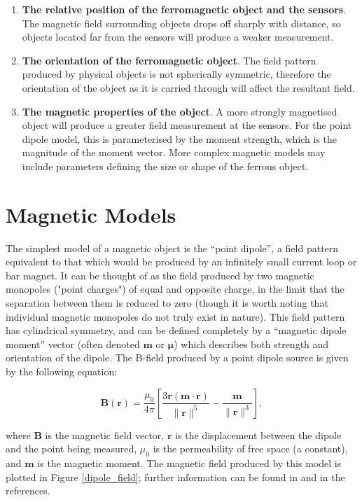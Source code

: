 \documentclass[10pt, a4paper, twocolumn]{article} %
\begin{document}
\begin{enumerate}
	\item \textbf{The relative position of the ferromagnetic object and the sensors}. The magnetic field surrounding objects drops off sharply with distance, so objects located far from the sensors will produce a weaker measurement.
	
	\item \textbf{The orientation of the ferromagnetic object}. The field pattern produced by physical objects is not spherically symmetric, therefore the orientation of the object as it is carried through will affect the resultant field.
	
	\item \textbf{The magnetic properties of the object}. A more strongly magnetised object will produce a greater field measurement at the sensors. For the point dipole model, this is parameterised by the moment strength, which is the magnitude of the moment vector. More complex magnetic models may include parameters defining the size or shape of the ferrous object.
\end{enumerate}

\section{Magnetic Models}
\label{Mag_models}

The simplest model of a magnetic object is the “point dipole”, a field pattern equivalent to that which would be produced by an infinitely small current loop or bar magnet. It can be thought of as the field produced by two magnetic monopoles ("point charges") of equal and opposite charge, in the limit that the separation between them is reduced to zero (though it is worth noting that individual magnetic monopoles do not truly exist in nature). This field pattern has cylindrical symmetry, and can be defined completely by a “magnetic dipole moment” vector (often denoted $\mathbf{m}$ or $\boldsymbol{\mu}$) which describes both strength and orientation of the dipole. The B-field produced by a point dipole source is given by the following equation:

\begin{equation}
	{\mathbf{B} ({\mathbf{r} }) = {\frac{\mu_{0}}{4\pi}} \left[{\frac {3\mathbf{r} (\mathbf{m} \cdot \mathbf {r} )}{\lVert \mathbf{r} \rVert^{5}}}-{\frac {\mathbf {m} }{\lVert \mathbf{r} \rVert^{3}}} \right],}
\end{equation}

where $\mathbf{B}$ is the magnetic field vector, $\mathbf{r}$ is the displacement between the dipole and the point being measured, $\mu_0$ is the permeability of free space (a constant),  and $\mathbf{m}$ is the magnetic moment.
The magnetic field produced by this model is plotted in Figure \ref{dipole_field}; further information can be found in \parencite{WikiDipole} and \parencite{HPDipole} in the references.
\end{document}
